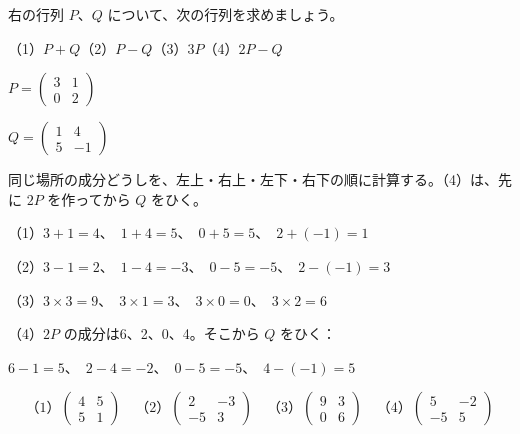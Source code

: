 \begin{reidai}[和・差・実数倍]
\noindent\begin{minipage}[c]{0.56\linewidth}\raggedright
右の行列 $P$、$Q$ について、次の行列を求めましょう。\par
（1）$P+Q$\quad （2）$P-Q$\newline （3）$3P$\quad （4）$2P-Q$
\end{minipage}\hfill
\begin{minipage}[c]{0.42\linewidth}\centering
$P=\begin{pmatrix} 3 & 1\\ 0 & 2 \end{pmatrix}$\par\vspace{2pt}$Q=\begin{pmatrix} 1 & 4\\ 5 & -1 \end{pmatrix}$
\end{minipage}\par
\kangaekata 同じ場所の成分どうしを、左上・右上・左下・右下の順に計算する。（4）は、先に $2P$ を作ってから $Q$ をひく。\par
\shiki\kviibs{}\zw{} （1）$3+1=4$、\ $1+4=5$、\ $0+5=5$、\ $2+(-1)=1$\par
\kviiba（2）$3-1=2$、\ $1-4=-3$、\ $0-5=-5$、\ $2-(-1)=3$\par
\kviiba（3）$3\times3=9$、\ $3\times1=3$、\ $3\times0=0$、\ $3\times2=6$\par
\kviiba（4）$2P$ の成分は6、2、0、4。そこから $Q$ をひく：\par
\kviiba\phantom{（4）}$6-1=5$、\ $2-4=-2$、\ $0-5=-5$、\ $4-(-1)=5$\par
\kotae
\[ \text{（1）}\begin{pmatrix} 4 & 5\\ 5 & 1 \end{pmatrix}\quad \text{（2）}\begin{pmatrix} 2 & -3\\ -5 & 3 \end{pmatrix}\quad \text{（3）}\begin{pmatrix} 9 & 3\\ 0 & 6 \end{pmatrix}\quad \text{（4）}\begin{pmatrix} 5 & -2\\ -5 & 5 \end{pmatrix} \]
\end{reidai}


